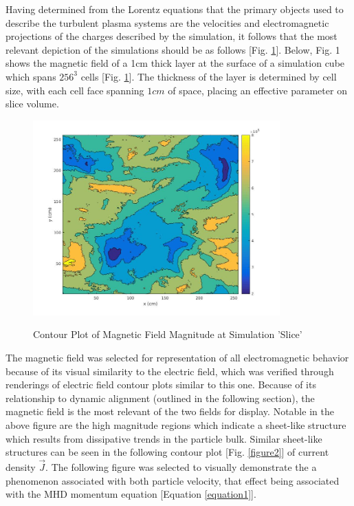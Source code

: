 \documentclass[journal, a4paper]{IEEEtran}
\begin{document}
Having determined from the Lorentz equations that the primary objects used to describe the turbulent plasma systems are the velocities and electromagnetic projections of the charges described by the simulation, it follows that the most relevant depiction of the simulations should be as follows [Fig. \ref{figure1}]. Below, Fig. 1 shows the magnetic field of a 1cm thick layer at the surface of a simulation cube which spans $256^3$ cells [Fig. \ref{figure1}]. The thickness of the layer is determined by cell size, with each cell face spanning $1 cm$ of space, placing an effective parameter on slice volume. 
\vspace{.4cm}

\begin{figure}[H]
\caption{Contour Plot of Magnetic Field Magnitude at Simulation 'Slice'}
\includegraphics[width=9.5cm]{bfieldslice.jpg}
\label{figure1}
\centering
\end{figure}
\vspace{.4cm}

The magnetic field was selected for representation of all electromagnetic behavior because of its visual similarity to the electric field, which was verified through renderings of electric field contour plots similar to this one. Because of its relationship to dynamic alignment (outlined in the following section), the magnetic field is the most relevant of the two fields for display. Notable in the above figure are the high magnitude regions which indicate a sheet-like structure which results from dissipative trends in the particle bulk. Similar sheet-like structures can be seen in the following contour plot [Fig. \ref{figure2}] of current density $\vec{J}$. The following figure was selected to visually demonstrate the a phenomenon associated with both particle velocity, that effect being associated with the MHD momentum equation [Equation \ref{equation1}].
\end{document}
